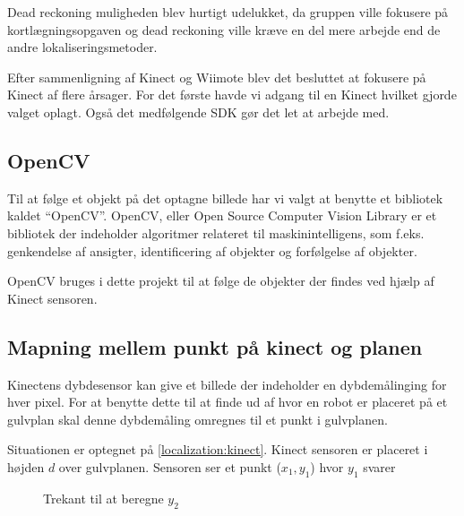 Dead reckoning muligheden blev hurtigt udelukket, da gruppen ville fokusere på kortlægningsopgaven og dead reckoning ville kræve en del mere arbejde end de andre lokaliseringsmetoder.

Efter sammenligning af Kinect og Wiimote blev det besluttet at fokusere på Kinect af flere årsager.
For det første havde vi adgang til en Kinect hvilket gjorde valget oplagt. 
Også det medfølgende SDK gør det let at arbejde med.

\subsection{OpenCV}
Til at følge et objekt på det optagne billede har vi valgt at benytte et bibliotek kaldet ``OpenCV''.
OpenCV, eller Open Source Computer Vision Library er et bibliotek der indeholder algoritmer relateret til maskinintelligens, som f.eks. genkendelse af ansigter, identificering af objekter og forfølgelse af objekter.\cite{opencv}

OpenCV bruges i dette projekt til at følge de objekter der findes ved hjælp af Kinect sensoren.

\clearpage
\subsection{Mapning mellem punkt på kinect og planen}

Kinectens dybdesensor kan give et billede der indeholder en dybdemålinging for hver pixel. 
For at benytte dette til at finde ud af hvor en robot er placeret på et gulvplan skal denne dybdemåling omregnes til et punkt i gulvplanen.

Situationen er optegnet på \cref{localization:kinect}.
Kinect sensoren er placeret i højden $ d $ over gulvplanen. 
Sensoren ser et punkt ($ x_1,y_1 $) hvor $ y_1 $ svarer 

\begin{figure}
\caption{Trekant til at beregne $ y_2 $}
\label{localization:trekant}
\end{figure}

